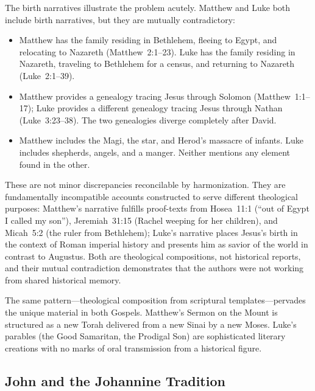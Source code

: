 \documentclass[12pt,oneside]{article}
\begin{document}
The birth narratives illustrate the problem acutely.  Matthew and Luke
both include birth narratives, but they are mutually contradictory:

\begin{itemize}[leftmargin=2em]
\item Matthew has the family residing in Bethlehem, fleeing to Egypt,
and relocating to Nazareth (Matthew~2:1--23).  Luke has the family
residing in Nazareth, traveling to Bethlehem for a census, and
returning to Nazareth (Luke~2:1--39).
\item Matthew provides a genealogy tracing Jesus through Solomon
(Matthew~1:1--17); Luke provides a different genealogy tracing Jesus
through Nathan (Luke~3:23--38).  The two genealogies diverge
completely after David.
\item Matthew includes the Magi, the star, and Herod's massacre of
infants.  Luke includes shepherds, angels, and a manger.  Neither
mentions any element found in the other.
\end{itemize}

These are not minor discrepancies reconcilable by harmonization.  They
are fundamentally incompatible accounts constructed to serve different
theological purposes: Matthew's narrative fulfills proof-texts from
Hosea~11:1 (``out of Egypt I called my son''), Jeremiah~31:15
(Rachel weeping for her children), and Micah~5:2 (the ruler from
Bethlehem); Luke's narrative places Jesus's birth in the context of
Roman imperial history and presents him as savior of the world in
contrast to Augustus.  Both are theological compositions, not
historical reports, and their mutual contradiction demonstrates that
the authors were not working from shared historical memory.

The same pattern---theological composition from scriptural
templates---pervades the unique material in both Gospels.  Matthew's
Sermon on the Mount is structured as a new Torah delivered from a new
Sinai by a new Moses.  Luke's parables (the Good Samaritan, the
Prodigal Son) are sophisticated literary creations with no marks of
oral transmission from a historical figure.

\subsection{John and the Johannine Tradition}
\label{sec:gospels:john}
\end{document}
